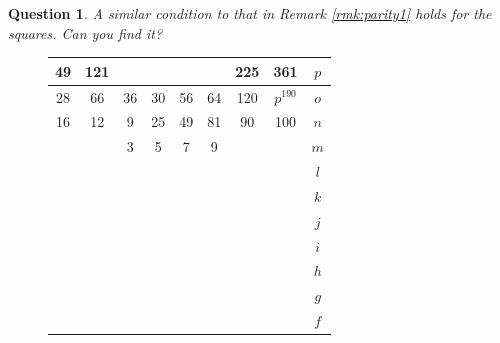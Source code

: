 \documentclass[14pt]{extarticle}
\newtheorem{question}{Question}
\begin{document}
\begin{question}
  \label{question:parity1}
A similar condition to that in Remark \ref{rmk:parity1}
holds for the squares. Can you find it?
\end{question}  



\begin{figure}[H] 
\centering 
\begin{tabular}{|c|c|c|c|c|c|c|c||c} \hline
\squadfill{\,}49 & \squadfill{\,}121 & \quad  & \quad  & \quad  & \quad  & \squadfill{\,}225 & \squadfill{\,}361 & $p$ \\ \hline
\squadfill{\,}28 & \squadfill{\,}66 & \trianglepafill{\,}36 & \trianglepafill{\,}30 & \trianglepafill{\,}56 & \trianglepafill{\,}64 & \squadfill{\,}120 & \rhombusfill{\,}$p^{190}$ & $o$ \\ \hline
\trianglepafill{\,}16 & \trianglepafill{\,}12 & \circletfill{\,}9 & \circletfill{\,}25 & \circletfill{\,}49 & \circletfill{\,}81 & \trianglepafill{\,}90 & \trianglepafill{\,}100 & $n$ \\ \hline
\quad  & \quad  & \circletfill{\,}3 & \circletfill{\,}5 & \circletfill{\,}7 & \circletfill{\,}9 & \quad  & \quad  & $m$ \\ \hline
\quad  & \quad  & \quad  & \quad  & \quad  & \quad  & \quad  & \quad  & $l$ \\ \hline
\quad  & \quad  & \quad  & \quad  & \quad  & \quad  & \quad  & \quad  & $k$ \\ \hline
\quad  & \quad  & \quad  & \quad  & \quad  & \quad  & \quad  & \quad  & $j$ \\ \hline
\quad  & \quad  & \quad  & \quad  & \quad  & \quad  & \quad  & \quad  & $i$ \\ \hline
\quad  & \quad  & \quad  & \quad  & \quad  & \quad  & \quad  & \quad  & $h$ \\ \hline
\quad  & \quad  & \quad  & \quad  & \quad  & \quad  & \quad  & \quad  & $g$ \\ \hline
\quad  & \quad  & \quad  & \quad  & \quad  & \quad  & \quad  & \quad  & $f$ \\ \hline

\end{tabular}
\end{figure}
\end{document}
